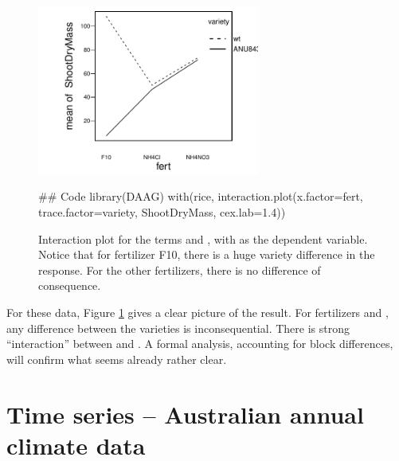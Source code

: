 \begin{figure}
\begin{Schunk}


\centerline{\includegraphics[width=0.65\textwidth]{figs/03-do-interact-1} }

\end{Schunk}
    \caption{Interaction plot for the terms  and
      , with  as the dependent
      variable. Notice that for fertilizer F10, there is a huge
      variety difference in the response. For the other fertilizers,
      there is no difference of consequence.\label{fig:rice-interact}}
\begin{Schunk}
\begin{Sinput}
## Code
library(DAAG)
with(rice, interaction.plot(x.factor=fert,
                            trace.factor=variety,
                            ShootDryMass,
                            cex.lab=1.4))
\end{Sinput}
\end{Schunk}
\end{figure}

For these data, 
Figure \ref{fig:rice-interact} gives a clear picture
of the result. For fertilizers  and , any
difference between the varieties is inconsequential.   There is
strong ``interaction'' between  and .  A
formal analysis, accounting for block differences, will confirm what
seems already rather clear. 

\section{Time series -- Australian annual climate data}

